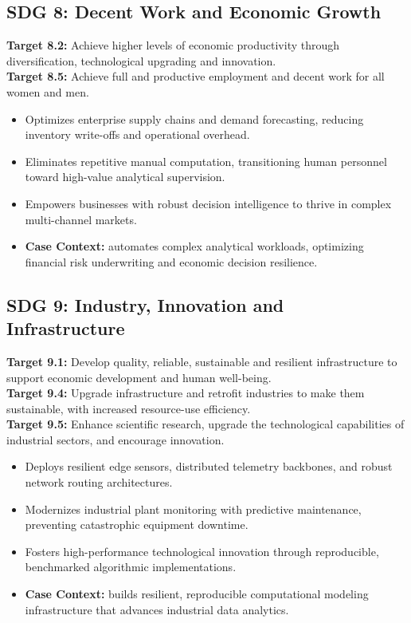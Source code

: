 \subsection{SDG 8: Decent Work and Economic Growth}
\noindent\textbf{Target 8.2:} Achieve higher levels of economic productivity through diversification, technological upgrading and innovation. \\
\noindent\textbf{Target 8.5:} Achieve full and productive employment and decent work for all women and men.
\begin{itemize}
  \item Optimizes enterprise supply chains and demand forecasting, reducing inventory write-offs and operational overhead.
  \item Eliminates repetitive manual computation, transitioning human personnel toward high-value analytical supervision.
  \item Empowers businesses with robust decision intelligence to thrive in complex multi-channel markets.
  \item \textbf{Case Context:} automates complex analytical workloads, optimizing financial risk underwriting and economic decision resilience.
\end{itemize}

\subsection{SDG 9: Industry, Innovation and Infrastructure}
\noindent\textbf{Target 9.1:} Develop quality, reliable, sustainable and resilient infrastructure to support economic development and human well-being. \\
\noindent\textbf{Target 9.4:} Upgrade infrastructure and retrofit industries to make them sustainable, with increased resource-use efficiency. \\
\noindent\textbf{Target 9.5:} Enhance scientific research, upgrade the technological capabilities of industrial sectors, and encourage innovation.
\begin{itemize}
  \item Deploys resilient edge sensors, distributed telemetry backbones, and robust network routing architectures.
  \item Modernizes industrial plant monitoring with predictive maintenance, preventing catastrophic equipment downtime.
  \item Fosters high-performance technological innovation through reproducible, benchmarked algorithmic implementations.
  \item \textbf{Case Context:} builds resilient, reproducible computational modeling infrastructure that advances industrial data analytics.
\end{itemize}

